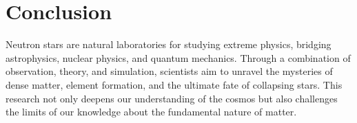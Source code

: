 \documentclass[12pt]{article}
\begin{document}
\section{Conclusion}
Neutron stars are natural laboratories for studying extreme physics, bridging astrophysics, nuclear physics, and quantum mechanics. Through a combination of observation, theory, and simulation, scientists aim to unravel the mysteries of dense matter, element formation, and the ultimate fate of collapsing stars. This research not only deepens our understanding of the cosmos but also challenges the limits of our knowledge about the fundamental nature of matter.
\end{document}
